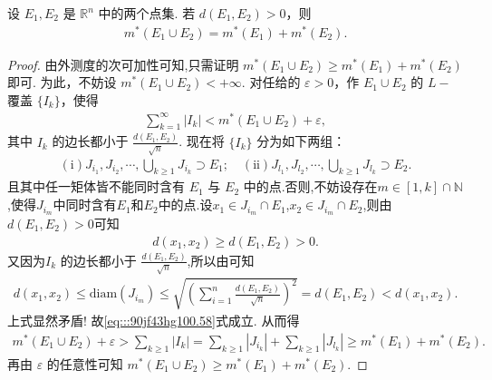 \documentclass[../../main.tex]{subfiles}%
\begin{document}
\begin{theorem}\label{theorem:距离大于零的两个点集的外测度满足可数可加性}
设 \(E_1, E_2\) 是 \(\mathbb{R}^n\) 中的两个点集. 若 \(d(E_1, E_2)>0\)，则
\begin{align*}
m^*(E_1 \cup E_2) = m^*(E_1) + m^*(E_2).
\end{align*}
\end{theorem}
\begin{proof}
由外测度的次可加性可知,只需证明 \(m^*(E_1 \cup E_2) \geqslant  m^*(E_1) + m^*(E_2)\) 即可. 为此，不妨设 \(m^*(E_1 \cup E_2)< + \infty\). 对任给的 \(\varepsilon > 0\)，作 \(E_1 \cup E_2\) 的 \(L -\)覆盖 \(\{I_k\}\)，使得
\begin{align*}
\sum_{k = 1}^{\infty} |I_k| < m^*(E_1 \cup E_2) + \varepsilon,
\end{align*}
其中 \(I_k\) 的边长都小于 \(\frac{d\left( E_1,E_2 \right)}{\sqrt{n}}\). 现在将 \(\{I_k\}\) 分为如下两组：
\begin{align}
(\text{i})J_{i_1}, J_{i_2}, \cdots,\bigcup_{k \geqslant  1} J_{i_k} \supset E_1 ; \quad (\text{ii})J_{l_1}, J_{l_2}, \cdots,\bigcup_{k \geqslant  1} J_{l_k} \supset E_2.\label{eq:::90jf43hg100.58}
\end{align}
且其中任一矩体皆不能同时含有 \(E_1\) 与 \(E_2\) 中的点.否则,不妨设存在$m\in [1,k]\cap \mathbb{N}$,使得$J_{i_m}$中同时含有$E_1$和$E_2$中的点.设$x_1\in J_{i_m}\cap E_1$,$x_2\in J_{i_m}\cap E_2$,则由$d(E_1,E_2)>0$可知
\begin{align*}
d(x_1,x_2) \geqslant d(E_1,E_2) > 0.
\end{align*}
又因为\(I_k\) 的边长都小于 \(\frac{d\left( E_1,E_2 \right)}{\sqrt{n}}\),所以由可知
\begin{align*}
d(x_1,x_2)\leqslant \mathrm{diam}\left( J_{i_m} \right) \leqslant \sqrt{\left( \sum_{i=1}^n{\frac{d\left( E_1,E_2 \right)}{\sqrt{n}}} \right) ^2}=d(E_1,E_2)<d(x_1,x_2).
\end{align*}
上式显然矛盾!
故\eqref{eq:::90jf43hg100.58}式成立.
从而得
\begin{align*}
m^*(E_1 \cup E_2) + \varepsilon > \sum_{k \geqslant  1} |I_k| = \sum_{k \geqslant  1} |J_{i_k}| + \sum_{k \geqslant  1} |J_{l_k}| \geqslant  m^*(E_1) + m^*(E_2).
\end{align*}
再由 \(\varepsilon\) 的任意性可知 \(m^*(E_1 \cup E_2) \geqslant  m^*(E_1) + m^*(E_2)\). 
\end{proof}
\end{document}
